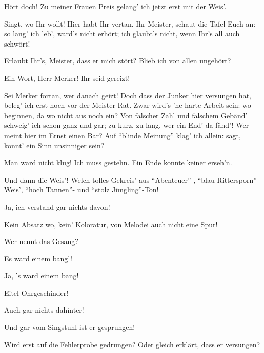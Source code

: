 \begin{drama}


\Waltherspeaks
Hört doch! Zu meiner Frauen Preis
gelang' ich jetzt erst mit der Weis'.

\Beckmesserspeaks
{}

Singt, wo Ihr wollt! Hier habt Ihr vertan.
Ihr Meister, schaut die Tafel Euch an:
so lang' ich leb', ward's nicht erhört;
ich glaubt's nicht, wenn Ihr's all auch schwört!

\Waltherspeaks
Erlaubt Ihr's, Meister, dass er mich stört?
Blieb ich von allen ungehört?

\Pognerspeaks
Ein Wort, Herr Merker! Ihr seid gereizt!

\Beckmesserspeaks
Sei Merker fortan, wer danach geizt!
Doch dass der Junker hier versungen hat,
beleg' ich erst noch vor der Meister Rat.
Zwar wird's 'ne harte Arbeit sein:
wo beginnen, da wo nicht aus noch ein?
Von falscher Zahl und falschem Gebänd'
schweig' ich schon ganz und gar;
zu kurz, zu lang, wer ein End' da fänd'!
Wer meint hier im Ernst einen Bar?
Auf ``blinde Meinung'' klag' ich allein:
sagt, konnt' ein Sinn unsinniger sein?



Man ward nicht klug! Ich muss gestehn.
Ein Ende konnte keiner erseh'n.

\Beckmesserspeaks
Und dann die Weis'! Welch tolles Gekreis'
aus ``Abenteuer''-, ``blau Rittersporn''-Weis',
``hoch Tannen''- und ``stolz Jüngling''-Ton!

\Kothnerspeaks
Ja, ich verstand gar nichts davon!

\Beckmesserspeaks
Kein Absatz wo, kein' Koloratur,
von Melodei auch nicht eine Spur!

Wer nennt das Gesang?

\Moserspeaks
Es ward einem bang'!

\Nachtigallspeaks
Ja, 's ward einem bang!

\Vogelgesangspeaks
Eitel Ohrgeschinder!

\Zornspeaks
Auch gar nichts dahinter!

\Kothnerspeaks
Und gar vom Singstuhl ist er gesprungen!

\Beckmesserspeaks
Wird erst auf die Fehlerprobe gedrungen?
Oder gleich erklärt, dass er versungen?

\Sachsspeaks


\end{drama}
